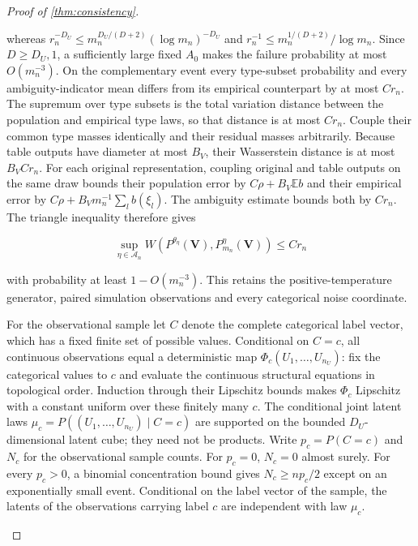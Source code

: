 \begin{proof}[Proof of \cref{thm:consistency}]
\begin{enumerate}
whereas $r_n^{-D_U}\leqslant m_n^{D_U/(D+2)}(\log m_n)^{-D_U}$ and $r_n^{-1}\leqslant m_n^{1/(D+2)}/\log m_n$. Since $D\geqslant D_U,1$, a sufficiently large fixed $A_0$ makes the failure probability at most $O(m_n^{-3})$. On the complementary event every type-subset probability and every ambiguity-indicator mean differs from its empirical counterpart by at most $Cr_n$. The supremum over type subsets is the total variation distance between the population and empirical type laws, so that distance is at most $Cr_n$. Couple their common type masses identically and their residual masses arbitrarily. Because table outputs have diameter at most $B_V$, their Wasserstein distance is at most $B_VCr_n$. For each original representation, coupling original and table outputs on the same draw bounds their population error by $C\rho+B_V\mathbb E b$ and their empirical error by $C\rho+B_Vm_n^{-1}\sum_l b(\xi_l)$. The ambiguity estimate bounds both by $Cr_n$. The triangle inequality therefore gives

\[
\sup_{\eta\in\mathcal A_n}W(P^{\theta_\eta}(\boldsymbol V),P_{m_n}^\eta(\boldsymbol V))\leqslant Cr_n
\]

with probability at least $1-O(m_n^{-3})$. This retains the positive-temperature generator, paired simulation observations and every categorical noise coordinate. 

For the observational sample let $C$ denote the complete categorical label vector, which has a fixed finite set of possible values. Conditional on $C=c$, all continuous observations equal a deterministic map $\Phi_c(U_1,\ldots,U_{n_U})$: fix the categorical values to $c$ and evaluate the continuous structural equations in topological order. Induction through their Lipschitz bounds makes $\Phi_c$ Lipschitz with a constant uniform over these finitely many $c$. The conditional joint latent laws $\mu_c=P((U_1,\ldots,U_{n_U})\mid C=c)$ are supported on the bounded $D_U$-dimensional latent cube; they need not be products. Write $p_c=P(C=c)$ and $N_c$ for the observational sample counts. For $p_c=0$, $N_c=0$ almost surely. For every $p_c>0$, a binomial concentration bound gives $N_c\geqslant np_c/2$ except on an exponentially small event. Conditional on the label vector of the sample, the latents of the observations carrying label $c$ are independent with law $\mu_c$. 


\end{enumerate}
\end{proof}
